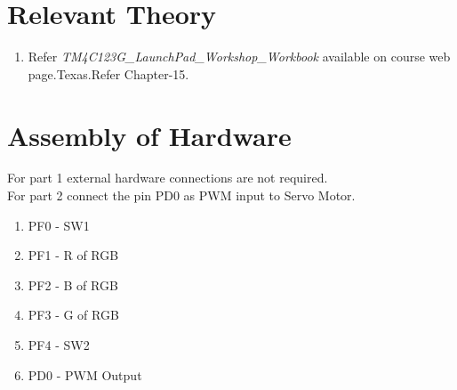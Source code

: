 \documentclass[a4paper,12pt,oneside]{book}
\begin{document}
 
\section {Relevant Theory}
\begin{enumerate}
\item  Refer \textit {TM4C123G\_LaunchPad\_Workshop\_Workbook} available on course web page.Texas.Refer Chapter-15. 
\end{enumerate}

\section{Assembly of Hardware}
For part 1 external hardware connections are not required.\\
For part 2 connect the pin PD0 as PWM input to Servo Motor.\\
\begin{enumerate}
\item PF0 - SW1
\item PF1 - R of RGB
\item PF2 - B of RGB
\item PF3 - G of RGB
\item PF4 - SW2
\item PD0 - PWM Output
\end{enumerate}

\end{document}
